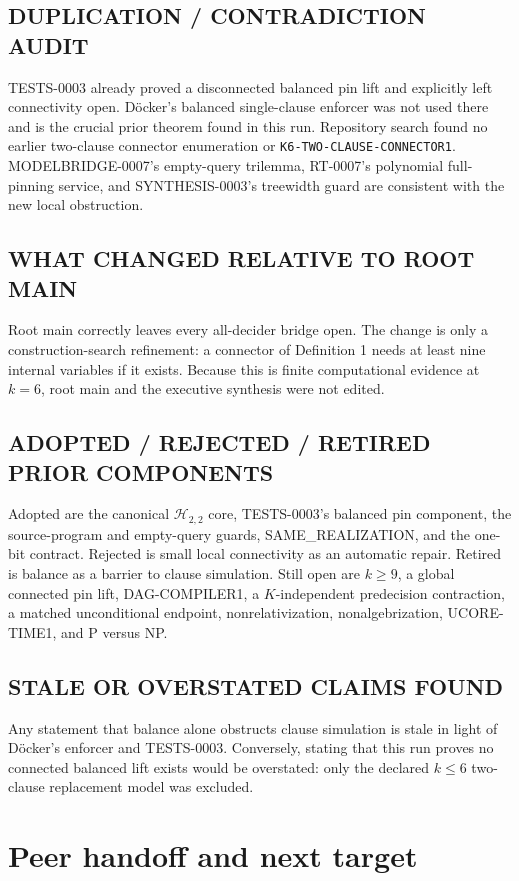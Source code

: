 \documentclass[11pt]{article}
\begin{document}
\subsection*{DUPLICATION / CONTRADICTION AUDIT}
TESTS-0003 already proved a disconnected balanced pin lift and explicitly
left connectivity open.  D\"ocker's balanced single-clause enforcer was not
used there and is the crucial prior theorem found in this run.  Repository
search found no earlier two-clause connector enumeration or
\texttt{K6-TWO-CLAUSE-CONNECTOR1}.  MODELBRIDGE-0007's empty-query trilemma,
RT-0007's polynomial full-pinning service, and SYNTHESIS-0003's treewidth
guard are consistent with the new local obstruction.

\subsection*{WHAT CHANGED RELATIVE TO ROOT MAIN}
Root main correctly leaves every all-decider bridge open.  The change is only
a construction-search refinement: a connector of Definition 1 needs at
least nine internal variables if it exists.  Because this is finite
computational evidence at $k=6$, root main and the executive synthesis were
not edited.

\subsection*{ADOPTED / REJECTED / RETIRED PRIOR COMPONENTS}
Adopted are the canonical $\mathcal H_{2,2}$ core, TESTS-0003's balanced pin
component, the source-program and empty-query guards, SAME\_REALIZATION, and
the one-bit contract.  Rejected is small local connectivity as an automatic
repair.  Retired is balance as a barrier to clause simulation.  Still open
are $k\ge9$, a global connected pin lift, DAG-COMPILER1, a $K$-independent
predecision contraction, a matched unconditional endpoint,
nonrelativization, nonalgebrization, UCORE-TIME1, and P versus NP.

\subsection*{STALE OR OVERSTATED CLAIMS FOUND}
Any statement that balance alone obstructs clause simulation is stale in
light of D\"ocker's enforcer and TESTS-0003.  Conversely, stating that this
run proves no connected balanced lift exists would be overstated: only the
declared $k\le6$ two-clause replacement model was excluded.

\section{Peer handoff and next target}
\end{document}
